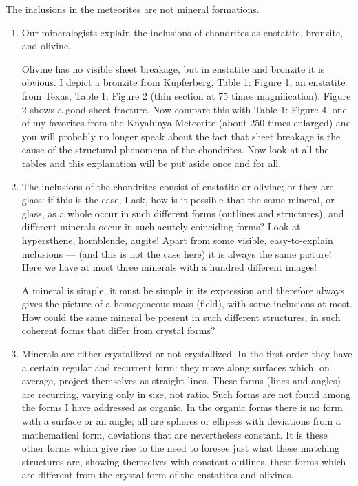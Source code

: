\documentclass[a4paper, 11pt, oneside]{article}
\begin{document}
The inclusions in the meteorites are not mineral formations.
\begin{enumerate}
    \item Our mineralogists explain the inclusions of chondrites as enstatite, bronzite, and olivine. 
    
    Olivine has no visible sheet breakage, but in enstatite and bronzite it is obvious. I depict a bronzite from Kupferberg, Table 1: Figure 1, an enstatite from Texas, Table 1: Figure 2 (thin section at 75 times magnification). Figure 2 shows a good sheet fracture. Now compare this with Table 1: Figure 4, one of my favorites from the Knyahinya Meteorite (about 250 times enlarged) and you will probably no longer speak about the fact that sheet breakage is the cause of the structural phenomena of the chondrites. Now look at all the tables and this explanation will be put aside once and for all.
    \item The inclusions of the chondrites consist of enstatite or olivine; or they are glass: if this is the case, I ask, how is it possible that the same mineral, or glass, as a whole occur in such different forms (outlines and structures), and different minerals occur in such acutely coinciding forms? Look at hypersthene, hornblende, augite! Apart from some visible, easy-to-explain inclusions — (and this is not the case here) it is always the same picture! Here we have at most three minerals with a hundred different images!
    
    A mineral is simple, it must be simple in its expression and therefore always gives the picture of a homogeneous mass (field), with some inclusions at most. How could the same mineral be present in such different structures, in such coherent forms that differ from crystal forms?
    \item Minerals are either crystallized or not crystallized. In the first order they have a certain regular and recurrent form: they move along surfaces which, on average, project themselves as straight lines. These forms (lines and angles) are recurring, varying only in size, not ratio. Such forms are not found among the forms I have addressed as organic. In the organic forms there is no form with a surface or an angle; all are spheres or ellipses with deviations from a mathematical form, deviations that are nevertheless constant. It is these other forms which give rise to the need to foresee just what these matching structures are, showing themselves with constant outlines, these forms which are different from the crystal form of the enstatites and olivines.
    

\end{enumerate}
\end{document}
